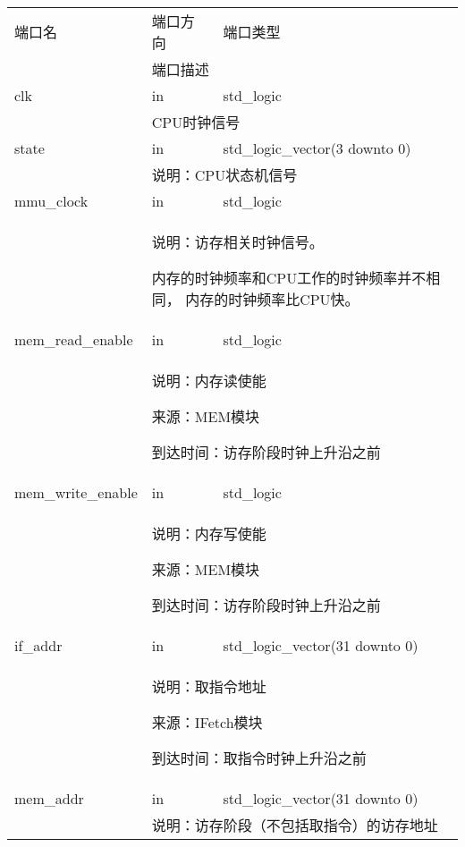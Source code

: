         \begin{tabularx}{\textwidth}{lll}
            \toprule
            端口名          & 端口方向  & 端口类型 \\
            \cmidrule(l){2-3}
            &
            \multicolumn{2}{X}{端口描述} \\
            \midrule
            clk             & in        & std\_logic \\
            \cmidrule(l){2-3}
            &
            \multicolumn{2}{X}{
                CPU时钟信号
            } \\
            \midrule
            state           & in        & std\_logic\_vector(3 downto 0) \\
            \cmidrule(l){2-3}
            &
            \multicolumn{2}{X}{
                说明：CPU状态机信号
            } \\
            \midrule
            mmu\_clock      & in        & std\_logic \\
            \cmidrule(l){2-3}
            &
            \multicolumn{2}{X}{
                说明：访存相关时钟信号。

                内存的时钟频率和CPU工作的时钟频率并不相同，%
                内存的时钟频率比CPU快。
            } \\
            \midrule
            mem\_read\_enable & in      & std\_logic \\
            \cmidrule(l){2-3}
            &
            \multicolumn{2}{X}{
                说明：内存读使能

                来源：MEM模块

                到达时间：访存阶段时钟上升沿之前
            } \\
            \midrule
            mem\_write\_enable & in     & std\_logic \\
            \cmidrule(l){2-3}
            &
            \multicolumn{2}{X}{
                说明：内存写使能

                来源：MEM模块

                到达时间：访存阶段时钟上升沿之前
            } \\
            \midrule
            if\_addr        & in        & std\_logic\_vector(31 downto 0) \\
            \cmidrule(l){2-3}
            &
            \multicolumn{2}{X}{
                说明：取指令地址

                来源：IFetch模块

                到达时间：取指令时钟上升沿之前
            } \\
            \midrule
            mem\_addr       & in        & std\_logic\_vector(31 downto 0) \\
            \cmidrule(l){2-3}
            &
            \multicolumn{2}{X}{
                说明：访存阶段（不包括取指令）的访存地址

}
\end{tabularx}
